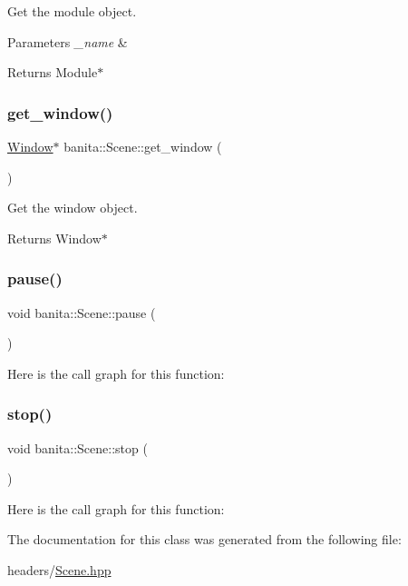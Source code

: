 Get the module object. 


\begin{DoxyParams}{Parameters}
{\em \+\_\+name} & \\
\hline
\end{DoxyParams}
\begin{DoxyReturn}{Returns}
Module$\ast$ 
\end{DoxyReturn}
\mbox{\label{classbanita_1_1_scene_ae3121d9444a4197d3f7ebfffd37d8a4a}} 
\subsubsection{\texorpdfstring{get\_window()}{get\_window()}}
{\footnotesize\ttfamily \mbox{\hyperlink{classbanita_1_1_window}{Window}}$\ast$ banita\+::\+Scene\+::get\+\_\+window (\begin{DoxyParamCaption}{ }\end{DoxyParamCaption})\hspace{0.3cm}{\ttfamily [inline]}}



Get the window object. 

\begin{DoxyReturn}{Returns}
Window$\ast$ 
\end{DoxyReturn}
\mbox{\label{classbanita_1_1_scene_a0b6fe86bd75f0baa4b7d8e259a8ebf07}} 
\subsubsection{\texorpdfstring{pause()}{pause()}}
{\footnotesize\ttfamily void banita\+::\+Scene\+::pause (\begin{DoxyParamCaption}{ }\end{DoxyParamCaption})\hspace{0.3cm}{\ttfamily [inline]}}

Here is the call graph for this function\+:
\mbox{\label{classbanita_1_1_scene_ad27b01f5b3a31a7fb81f5ec7dc6c63c6}} 
\subsubsection{\texorpdfstring{stop()}{stop()}}
{\footnotesize\ttfamily void banita\+::\+Scene\+::stop (\begin{DoxyParamCaption}{ }\end{DoxyParamCaption})\hspace{0.3cm}{\ttfamily [inline]}}

Here is the call graph for this function\+:


The documentation for this class was generated from the following file\+:\begin{DoxyCompactItemize}
\item 
headers/\mbox{\hyperlink{_scene_8hpp}{Scene.\+hpp}}\end{DoxyCompactItemize}
